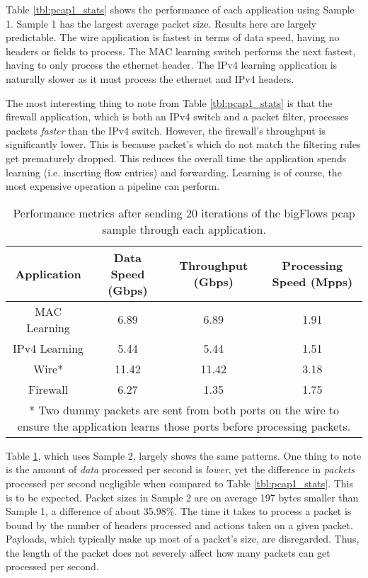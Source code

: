 Table \ref{tbl:pcap1_stats} shows the performance of each application using Sample 1. Sample 1 has the largest average packet size. Results here are largely predictable. The wire application is fastest in terms of data speed, having no headers or fields to process. The MAC learning switch performs the next fastest, having to only process the ethernet header. The IPv4 learning application is naturally slower as it must process the ethernet and IPv4 headers.

The most interesting thing to note from Table \ref{tbl:pcap1_stats} is that the firewall application, which is both an IPv4 switch and a packet filter, processes packets \textit{faster} than the IPv4 switch. However, the firewall's throughput is significantly lower. This is because packet's which do not match the filtering rules get prematurely dropped. This reduces the overall time the application spends learning (i.e. inserting flow entries) and forwarding. Learning is of course, the most expensive operation a pipeline can perform.

\begin{table}
\caption{Performance metrics after sending 20 iterations of the bigFlows pcap sample through each application.}
\begin{center}
\begin{tabularx}{\linewidth}{| c || c | c | c | }
\hline
Application & Data Speed (Gbps) & Throughput (Gbps) & Processing Speed (Mpps)  \\
\hline
MAC Learning & 6.89 & 6.89 & 1.91  \\
\hline
IPv4 Learning & 5.44 & 5.44 & 1.51  \\
\hline 
Wire* & 11.42 & 11.42 & 3.18 \\
\hline
Firewall & 6.27 & 1.35 & 1.75 \\
\hline
\multicolumn{4}{p{\linewidth}}{* Two dummy packets are sent from both ports on the wire to ensure the application learns those ports before processing packets.}
\end{tabularx}
\end{center}
\label{tbl:pcap2_stats}
\end{table}

Table \ref{tbl:pcap2_stats}, which uses Sample 2, largely shows the same patterns. One thing to note is the amount of \textit{data} processed per second is \textit{lower}, yet the difference in \textit{packets} processed per second negligible when compared to Table \ref{tbl:pcap1_stats}. This is to be expected. Packet sizes in Sample 2 are on average 197 bytes smaller than Sample 1, a difference of about 35.98\%. The time it takes to process a packet is bound by the number of headers processed and actions taken on a given packet. Payloads, which typically make up most of a packet's size, are disregarded. Thus, the length of the packet does not severely affect how many packets can get processed per second. 

